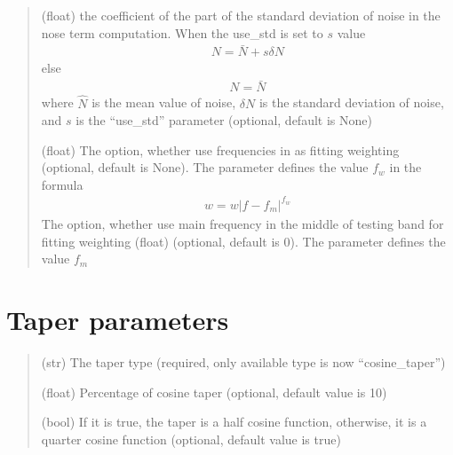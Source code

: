 \documentclass[letterpaper,10pt,english]{sphinxmanual}
\begin{document}
\begin{quote}
\begin{description}
\sphinxAtStartPar
(float) the coefficient of the part of the standard deviation of noise
in the nose term computation. When the use\_std is set to \(s\) value
\begin{equation*}
\begin{split}N = \bar{N} + s\delta{N}\end{split}
\end{equation*}
\sphinxAtStartPar
else
\begin{equation*}
\begin{split}N = \bar{N}\end{split}
\end{equation*}
\sphinxAtStartPar
where \(\widehat{N}\) is the mean value of noise,
\(\delta{N}\) is the standard deviation of noise,
and \(s\) is the “use\_std” parameter
(optional, default is None)

\sphinxAtStartPar
(float) The option,
whether use frequencies in as fitting weighting (optional, default is None).
The parameter defines the value \(f_w\) in the formula
\begin{equation*}
\begin{split}w = w\left| f - f_m \right|^{f_w}\end{split}
\end{equation*}
\sphinxAtStartPar
The option, whether use main frequency in the middle of testing band
for fitting weighting (float) (optional, default is 0).
The parameter defines the value \(f_m\)

\end{description}\end{quote}

\sphinxAtStartPar
{}


\section{Taper parameters}
\label{\detokenize{configuration:taper-parameters}}\begin{quote}\begin{description}
\sphinxAtStartPar
(str) The taper type (required, only available type is now “cosine\_taper”)

\sphinxAtStartPar
(float) Percentage of cosine taper (optional, default value is 10)

\sphinxAtStartPar
(bool) If it is true, the taper is a half cosine function,
otherwise, it is a quarter cosine function (optional, default value is true)

\end{description}\end{quote}
\end{document}
